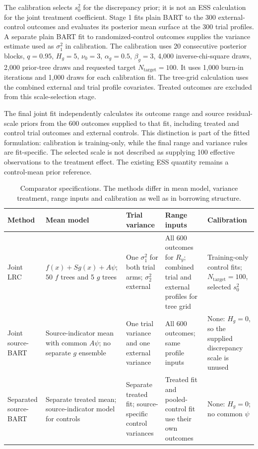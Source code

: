 \documentclass[11pt]{article}
\theoremstyle{remark}\newtheorem{remark}{Remark}[section]
\providecommand{\DIFaddtex}[1]{{\protect\color{blue} \sf #1}} %
\providecommand{\DIFaddFL}[1]{\DIFadd{#1}} %
\providecommand{\DIFadd}[1]{\texorpdfstring{\DIFaddtex{#1}}{#1}} %
\begin{document}
\DIFadd{The calibration selects $s_0^2$ for the discrepancy prior; it is not an ESS calculation for the joint treatment coefficient. Stage 1 fits plain BART to the 300 external-control outcomes and evaluates its posterior mean surface at the 300 trial profiles. A separate plain BART fit to randomized-control outcomes supplies the variance estimate used as $\sigma_1^2$ in calibration. The calibration uses 20 consecutive posterior blocks, $q=0.95$, $H_g=5$, $\nu_0=3$, $\alpha_g=0.5$, $\beta_g=3$, 4,000 inverse-chi-square draws, 2,000 prior-tree draws and requested target $N_{\mathrm{target}}=100$. It uses 1,000 burn-in iterations and 1,000 draws for each calibration fit. The tree-grid calculation uses the combined external and trial profile covariates. Treated outcomes are excluded from this scale-selection stage.
}

\DIFadd{The final joint fit independently calculates its outcome range and source residual-scale priors from the 600 outcomes supplied to that fit, including treated and control trial outcomes and external controls. This distinction is part of the fitted formulation: calibration is training-only, while the final range and variance rules are fit-specific. The selected scale is not described as supplying 100 effective observations to the treatment effect. The existing ESS quantity remains a control-mean prior reference.
}

\begin{table}[p]
\centering
\scriptsize
\setlength{\tabcolsep}{2pt}
\caption{\DIFaddFL{Comparator specifications. The methods differ in mean model, variance treatment, range inputs and calibration as well as in borrowing structure.}}
\label{tab:joint_comparators}
\begin{tabular}{@{}p{0.80in}p{1.35in}p{1.20in}p{1.20in}p{1.10in}@{}}
\toprule
\DIFaddFL{Method }& \DIFaddFL{Mean model }& \DIFaddFL{Trial variance }& \DIFaddFL{Range inputs }& \DIFaddFL{Calibration }\\
\midrule
\DIFaddFL{Joint LRC }& \DIFaddFL{$f(x)+Sg(x)+A\psi$; 50 $f$ trees and 5 $g$ trees }& \DIFaddFL{One $\sigma_1^2$ for both trial arms; $\sigma_2^2$ external }& \DIFaddFL{All 600 outcomes for $R_y$; combined trial and external profiles for tree grid }& \DIFaddFL{Training-only control fits; $N_{\mathrm{target}}=100$, selected $s_0^2$ }\\
\DIFaddFL{Joint source-BART }& \DIFaddFL{Source-indicator mean with common $A\psi$; no separate $g$ ensemble }& \DIFaddFL{One trial variance and one external variance }& \DIFaddFL{All 600 outcomes; same profile inputs }& \DIFaddFL{None: $H_g=0$, so the supplied discrepancy scale is unused }\\
\DIFaddFL{Separated source-BART }& \DIFaddFL{Separate treated mean; source-indicator model for controls }& \DIFaddFL{Separate treated fit; source-specific control variances }& \DIFaddFL{Treated fit and pooled-control fit use their own outcomes }& \DIFaddFL{None: $H_g=0$; no common $\psi$ }\\
\bottomrule
\end{tabular}
\end{table}
\end{document}
